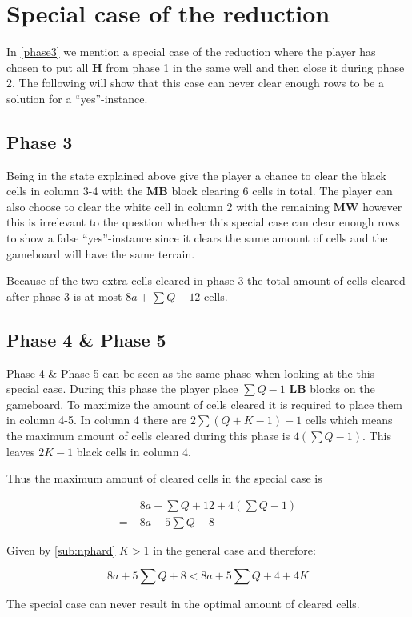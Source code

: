 \section{Special case of the reduction}
\label{specialcasereduction}

In \ref{phase3} we mention a special case of the reduction where the player has chosen to put all $\mathbf{H}$ from phase 1 in the same well and then close it during phase 2. The following will show that this case can never clear enough rows to be a solution for a ``yes''-instance.

\subsection{Phase 3}
Being in the state explained above give the player a chance to clear the black cells in column 3-4 with the $\mathbf{MB}$ block clearing 6 cells in total. The player can also choose to clear the white cell in column 2 with the remaining $\mathbf{MW}$ however this is irrelevant to the question whether this special case can clear enough rows to show a false ``yes''-instance since it clears the same amount of cells and the gameboard will have the same terrain.

Because of the two extra cells cleared in phase 3 the total amount of cells cleared after phase 3 is at most $8a + \sum Q + 12$ cells.

\subsection{Phase 4 \& Phase 5}

Phase 4 \& Phase 5 can be seen as the same phase when looking at the this special case. During this phase the player place $\sum Q - 1$ $\mathbf{LB}$ blocks on the gameboard. To maximize the amount of cells cleared it is required to place them in column 4-5. In column 4 there are $2 \sum \left( Q + K - 1 \right) - 1$ cells which means the maximum amount of cells cleared during this phase is $ 4 \left( \sum Q - 1 \right)$. This leaves $2K-1$ black cells in column 4.

Thus the maximum amount of cleared cells in the special case is

\begin{align*}
  & 8a + \sum Q + 12 + 4 \left( \sum Q - 1 \right) \\
= \; & 8a + 5 \sum Q + 8
\end{align*}

Given by \ref{sub:nphard} $K > 1$ in the general case and therefore: 

\begin{equation*}
8a + 5 \sum Q + 8 < 8a + 5 \sum Q + 4 + 4K
\end{equation*}

\begin{cor}
The special case can never result in the optimal amount of cleared cells.
\end{cor}
